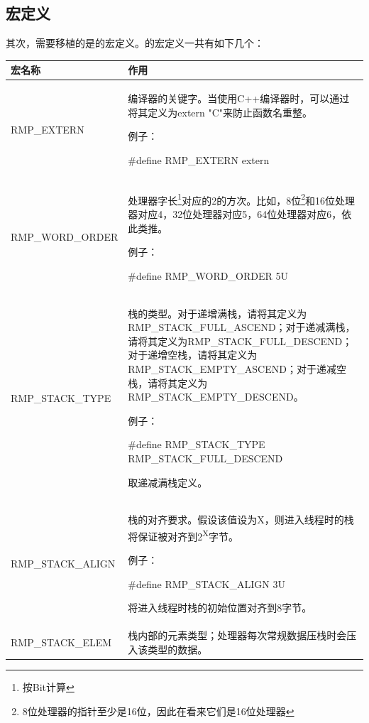 \subsection{宏定义}\label{subsec:macro-definitions}

其次，需要移植的是的宏定义。的宏定义一共有如下几个：

\label{tab:overview-of-macro-definitions}

{\def\LTcaptype{none} %
\begin{longtable}[]{@{}
  >{\raggedright\arraybackslash}p{}
  >{\raggedright\arraybackslash}p{}@{}}
\toprule\noalign{}
\begin{minipage}[b]{\linewidth}\raggedright
宏名称
\end{minipage} & \begin{minipage}[b]{\linewidth}\raggedright
作用
\end{minipage} \\
\midrule\noalign{}
\endhead
\bottomrule\noalign{}
\endlastfoot
RMP\_EXTERN & 编译器的关键字。当使用C++编译器时，可以通过将其定义为extern "C"来防止函数名重整。

例子：

\#define RMP\_EXTERN extern \\
RMP\_WORD\_ORDER &
处理器字长\footnote{按Bit计算}对应的2的方次。比如，8位\footnote{8位处理器的指针至少是16位，因此在看来它们是16位处理器}和16位处理器对应4，32位处理器对应5，64位处理器对应6，依此类推。

例子：

\#define RMP\_WORD\_ORDER 5U \\
RMP\_STACK\_TYPE &
栈的类型。对于递增满栈，请将其定义为RMP\_STACK\_FULL\_ASCEND；对于递减满栈，请将其定义为RMP\_STACK\_FULL\_DESCEND；对于递增空栈，请将其定义为RMP\_STACK\_EMPTY\_ASCEND；对于递减空栈，请将其定义为RMP\_STACK\_EMPTY\_DESCEND。

例子：

\#define RMP\_STACK\_TYPE RMP\_STACK\_FULL\_DESCEND

取递减满栈定义。 \\
RMP\_STACK\_ALIGN &
栈的对齐要求。假设该值设为X，则进入线程时的栈将保证被对齐到2\textsuperscript{X}字节。

例子：

\#define RMP\_STACK\_ALIGN 3U

将进入线程时栈的初始位置对齐到8字节。 \\
RMP\_STACK\_ELEM &
栈内部的元素类型；处理器每次常规数据压栈时会压入该类型的数据。


\end{longtable}}
